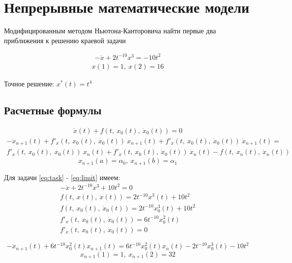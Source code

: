 \documentclass[12pt]{article}
\begin{document}
\section*{Непрерывные математические модели}

Модифицированным методом Ньютона-Канторовича найти первые два приближения к решению краевой задачи

\begin{gather}
    -\ddot{x} + 2t^{-10}x^3 = -10t^2 \label{eq:task}
\end{gather}
\begin{gather}
    x(1)=1,\ x(2)=16 \label{eq:limit}
\end{gather}

Точное решение: $x^*(t) = t^4$

\subsection*{Расчетные формулы}



\begin{gather}
\ddot{x}(t) + f(t,\ x_0(t),\ \dot{x}_0(t)) = 0
\end{gather}
\begin{multline}
	-\ddot{x}_{n+1}(t) + f'_x(t,\ x_0(t),\ \dot{x_0}(t))\ x_{n+1}(t) +
	f'_{\dot{x}}(t,\ x_0(t),\ \dot{x}_0(t))\ \dot{x}_{n+1}(t) = \\
	f'_x(t,\ x_0(t),\ \dot{x_0}(t))\ x_n(t) +
	f'_{\dot{x}}(t,\ x_0(t),\ \dot{x}_0(t))\ \dot{x}_n(t) -
	f(t,\ x_n(t),\ \dot{x}_n(t))
\end{multline}
\begin{equation}
	x_{n+1}(a) = \alpha_0,\ x_{n+1}(b) = \alpha_1
\end{equation}

Для задачи \eqref{eq:task} - \eqref{eq:limit} имеем:
\begin{gather*}
	-\ddot{x} + 2t^{-10}x^3 + 10t^2 = 0 \\
	f(t,\ x(t),\ \dot{x}(t)) = 2t^{-10}x^3(t) + 10t^2 \\
	f(t,\ x_0(t),\ \dot{x}_0(t)) = 2t^{-10}x^3_0(t) + 10t^2 \\
	f'_x(t,\ x_0(t),\ \dot{x}_0(t)) = 6t^{-10}x^2_0(t) \\
	f'_{\dot{x}}(t,\ x_0(t),\ \dot{x}_0(t)) = 0
\end{gather*}

\begin{equation}
    -\ddot{x}_{n+1}(t) + 6t^{-10}x^2_0(t)x_{n+1}(t) =
     6t^{-10}x^2_0(t)x_n(t) - 2t^{-10}x^3_0(t) - 10t^2
\end{equation}
\begin{equation}
    x_{n+1}(1)=1,\ x_{n+1}(2)=32
\end{equation}
\end{document}

